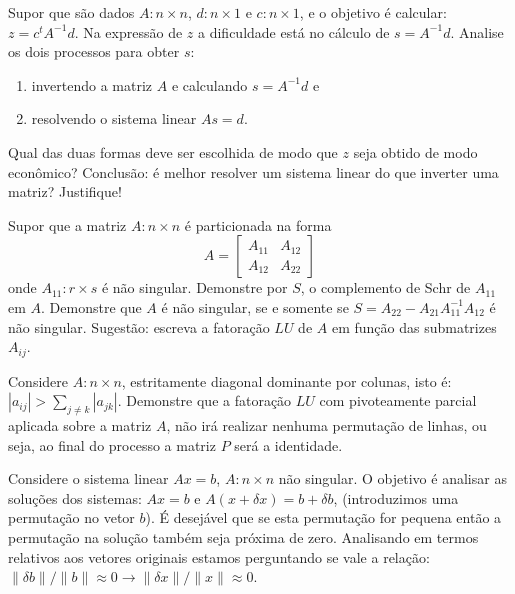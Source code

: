 \documentclass[a4paper,12pt, leqno, answers]{exam}
\begin{document}
\begin{questions}
\begin{solution}
    \end{solution}

    \question Supor que s\~{a}o dados $A : n \times n$, $d: n \times 1$ e $c : n \times 1$, e o objetivo \'{e} calcular: $z = c^t A^{-1} d$. Na express\~{a}o de $z$ a dificuldade est\'{a} no c\'{a}lculo de $s = A^{-1} d$. Analise os dois processos para obter $s$:
    \begin{enumerate}
        \item invertendo a matriz $A$ e calculando $s = A^{-1} d$ e
        \item resolvendo o sistema linear $A s = d$.
    \end{enumerate}
    Qual das duas formas deve ser escolhida de modo que $z$ seja obtido de modo econômico? Conclus\~{a}o: \'{e} melhor resolver um sistema linear do que inverter uma matriz? Justifique!
    \begin{solution}
        
    \end{solution}

    \question Supor que a matriz $A : n \times n$ \'{e} particionada na forma
    \[
    A = \begin{bmatrix}
        A_{11} & A_{12} \\
        A_{12} & A_{22}
    \end{bmatrix}
    \]
    onde $A_{11} : r \times s$ \'{e} n\~{a}o singular. Demonstre por $S$, o complemento de Schr de $A_{11}$ em $A$. Demonstre que $A$ \'{e} n\~{a}o singular, se e somente se $S = A_{22} - A_{21} A_{11}^{-1} A_{12}$ \'{e} n\~{a}o singular. Sugest\~{a}o: escreva a fatora\c{c}\~{a}o $LU$ de $A$ em fun\c{c}\~{a}o das submatrizes $A_{ij}$.
    \begin{solution}
        
    \end{solution}

    \question Considere $A : n \times n$, estritamente diagonal dominante por colunas, isto \'{e}: $| a_{ij} | > \sum_{j \neq k} | a_{jk} |$. Demonstre que a fatora\c{c}\~{a}o $LU$ com pivoteamente parcial aplicada sobre a matriz $A$, n\~{a}o ir\'{a} realizar nenhuma permuta\c{c}\~{a}o de linhas, ou seja, ao final do processo a matriz $P$ ser\'{a} a identidade.
    \begin{solution}
        
    \end{solution}

    \question Considere o sistema linear $A x = b$, $A : n \times n$ n\~{a}o singular. O objetivo \'{e} analisar as solu\c{c}\~{o}es dos sistemas: $A x = b$ e $A (x + \delta x) = b + \delta b$, (introduzimos uma permuta\c{c}\~{a}o no vetor $b$). \'{E} desej\'{a}vel que se esta permuta\c{c}\~{a}o for pequena ent\~{a}o a permuta\c{c}\~{a}o na solu\c{c}\~{a}o tamb\'{e}m seja pr\'{o}xima de zero. Analisando em termos relativos aos vetores originais estamos perguntando se vale a rela\c{c}\~{a}o: $\| \delta b\| / \| b \| \approx 0 \rightarrow \| \delta x \| / \| x \| \approx 0$.
    \begin{parts}

\end{parts}
\end{questions}
\end{document}
